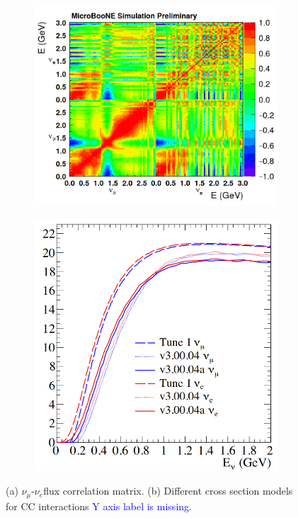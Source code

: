 \documentclass[a4paper]{article}
\begin{document}
\begin{figure}[ht] 
\begin{center}
    \begin{subfigure}[b]{0.42\textwidth}
    \centering
    \includegraphics[width=1.00\textwidth]{introduction/fluxcorrelation.png}
    \caption{\label{fig:numuconstraint:flux}}
    \end{subfigure}
    \begin{subfigure}[b]{0.3\textwidth}
    \centering
    \includegraphics[width=1.00\textwidth]{introduction/xsec_mcc8_mcc9.png}
    \caption{\label{fig:numuconstraint:xsec}}
    \end{subfigure}
\caption{\label{fig:numuconstraint} (a) $\nu_{\mu}$-$\nu_e$flux correlation matrix. (b) Different cross section models for CC interactions \textcolor{blue}{Y axis label is missing}.  }
\end{center}
\end{figure}
\end{document}
